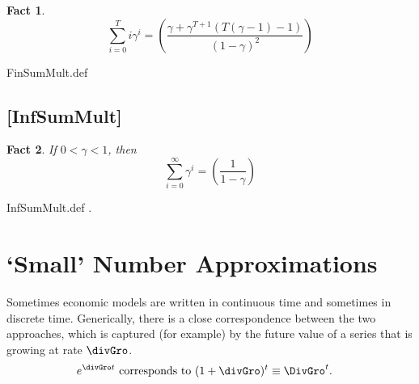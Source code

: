 \message{ !name(MathFactsList.tex)}\documentclass{handout}
\newtheorem{Fact}{Fact}
\begin{document}

\begin{Fact} 
\begin{equation}
\displaystyle \sum_{i=0}^{T} i \gamma^{i} = \left(\frac{\gamma + \gamma^{T+1}(T(\gamma-1)-1)}{(1-\gamma)^{2}}\right)
\end{equation} 
\end{Fact}

\begin{verbatimwrite}{FinSumMult.def}
\providecommand{\FinSumMult}{\href{https://www.econ2.jhu.edu/people/ccarroll/public/LectureNotes/MathFacts/MathFactsList\#FinSumMult}{\ensuremath{\mathtt{[FinSumMult]}}}}
\end{verbatimwrite}


\hypertarget{InfSumMult}{}

\subsection{[InfSumMult]}\label{fact:InfSumMult}


\begin{Fact} If $0 < \gamma < 1$, then 
\begin{equation}
\displaystyle \sum_{i=0}^{\infty} \gamma^{i} = \left(\frac{1}{1-\gamma}\right)
\end{equation}
\end{Fact}

\begin{verbatimwrite}{InfSumMult.def}
\providecommand{\InfSumMult}{\href{https://www.econ2.jhu.edu/people/ccarroll/public/LectureNotes/MathFacts/MathFactsList\#InfSumMult}{\ensuremath{\mathtt{[InfSumMult]}}}}.
\end{verbatimwrite}

\medskip
\section{`Small' Number Approximations}

Sometimes economic models are written in continuous time and sometimes
in discrete time.  Generically, there is a close
correspondence between the two approaches, which is captured (for
example) by the future value of a series that is growing at rate
$\divGro$.  
\begin{equation}\begin{gathered}\begin{aligned}
  e^{\divGro t} & \text{~corresponds to~}  (1+\divGro)^{t} \equiv \DivGro^{t}.
\end{aligned}\end{gathered}\end{equation}
\end{document}
